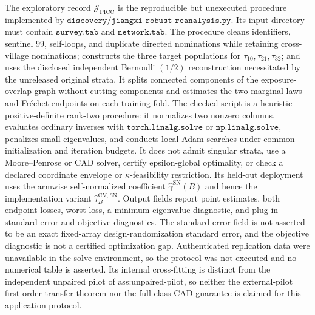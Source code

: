 The exploratory record \(\mathcal J_{\mathrm{PICC}}\) is the reproducible but unexecuted procedure implemented by \(\texttt{discovery/jiangxi\_robust\_reanalysis.py}\).  Its input directory must contain \(\texttt{survey.tab}\) and \(\texttt{network.tab}\).  The procedure cleans identifiers, sentinel \(99\), self-loops, and duplicate directed nominations while retaining cross-village nominations; constructs the three target populations for \(\tau_{10},\tau_{21},\tau_{32}\); and uses the disclosed independent Bernoulli \((1/2)\) reconstruction necessitated by the unreleased original strata.  It splits connected components of the exposure-overlap graph without cutting components and estimates the two marginal laws and Fr\'echet endpoints on each training fold.  The checked script is a heuristic positive-definite rank-two procedure: it normalizes two nonzero columns, evaluates ordinary inverses with \(\texttt{torch.linalg.solve}\) or \(\texttt{np.linalg.solve}\), penalizes small eigenvalues, and conducts local Adam searches under common initialization and iteration budgets.  It does not admit singular strata, use a Moore--Penrose or CAD solver, certify epsilon-global optimality, or check a declared coordinate envelope or \(\kappa\)-feasibility restriction.  Its held-out deployment uses the armwise self-normalized coefficient \(\widehat\gamma^{\mathrm{SN}}(B)\) and hence the implementation variant \(\widehat\tau_B^{\mathrm{CV,SN}}\).  Output fields report point estimates, both endpoint losses, worst loss, a minimum-eigenvalue diagnostic, and plug-in standard-error and objective diagnostics.  The standard-error field is not asserted to be an exact fixed-array design-randomization standard error, and the objective diagnostic is not a certified optimization gap.  Authenticated replication data were unavailable in the solve environment, so the protocol was not executed and no numerical table is asserted.  Its internal cross-fitting is distinct from the independent unpaired pilot of ass:unpaired-pilot, so neither the external-pilot first-order transfer theorem nor the full-class CAD guarantee is claimed for this application protocol.